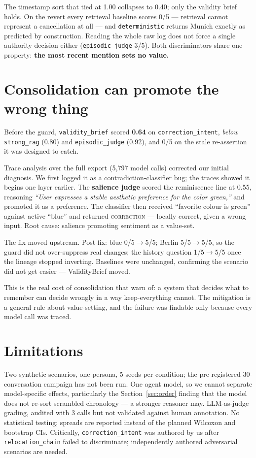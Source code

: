 \documentclass{article}
\newcommand{\sysname}{ValidityBrief}
\begin{document}
The timestamp sort that tied at 1.00 collapses to 0.40; only the validity brief holds. On the revert every retrieval baseline scores 0/5 --- retrieval cannot represent a cancellation at all --- and \texttt{deterministic} returns Munich exactly as predicted by construction. Reading the whole raw log does not force a single authority decision either (\texttt{episodic\_judge} 3/5). Both discriminators share one property: \textbf{the most recent mention sets no value.}

\section{Consolidation can promote the wrong thing}
\label{sec:bug}

Before the guard, \texttt{validity\_brief} scored \textbf{0.64} on \texttt{correction\_intent}, \emph{below} \texttt{strong\_rag} (0.80) and \texttt{episodic\_judge} (0.92), and 0/5 on the stale re-assertion it was designed to catch.

Trace analysis over the full export (5{,}797 model calls) corrected our initial diagnosis. We first logged it as a contradiction-classifier bug; the traces showed it begins one layer earlier. The \textbf{salience judge} scored the reminiscence line at 0.55, reasoning \emph{``User expresses a stable aesthetic preference for the color green,''} and promoted it as a preference. The classifier then received ``favorite colour is green'' against active ``blue'' and returned \textsc{correction} --- locally correct, given a wrong input. Root cause: salience promoting sentiment as a value-set.

The fix moved upstream. Post-fix: blue 0/5$\rightarrow$5/5; Berlin 5/5$\rightarrow$5/5, so the guard did not over-suppress real changes; the history question 1/5$\rightarrow$5/5 once the lineage stopped inverting. Baselines were unchanged, confirming the scenario did not get easier --- \sysname{} moved.

This is the real cost of consolidation that \citet{zhang2026faulty} warn of: a system that decides what to remember can decide wrongly in a way keep-everything cannot. The mitigation is a general rule about value-setting, and the failure was findable only because every model call was traced.

\section{Limitations}

Two synthetic scenarios, one persona, 5 seeds per condition; the pre-registered 30-conversation campaign has not been run. One agent model, so we cannot separate model-specific effects, particularly the Section~\ref{sec:order} finding that the model does not re-sort scrambled chronology --- a stronger reasoner may. LLM-as-judge grading, audited with 3 calls but not validated against human annotation. No statistical testing; spreads are reported instead of the planned Wilcoxon and bootstrap CIs. Critically, \texttt{correction\_intent} was authored by us after \texttt{relocation\_chain} failed to discriminate; independently authored adversarial scenarios are needed.
\end{document}
